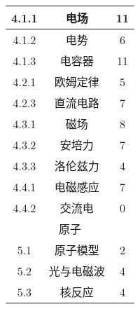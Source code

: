 \begin{center}
\begin{minipage}{0.48\textwidth}
\begin{tabular}{c|c|c}
            4.1.1&电场&11\\\hline
            4.1.2&电势&6\\\hline
            4.1.3&电容器&11\\\hline
            4.2.1&欧姆定律&5\\\hline
            4.2.3&直流电路&7\\\hline
            4.3.1&磁场&8\\\hline
            4.3.2&安培力&7\\\hline
            4.3.3&洛伦兹力&4\\\hline
            4.4.1&电磁感应&7\\\hline
            4.4.2&交流电&0\\\hline
            \multicolumn{3}{c}{原子}\\\hline
            5.1&原子模型&2\\\hline
            5.2&光与电磁波&4\\\hline
            5.3&核反应&4\\\hline
        \end{tabular}
    \end{minipage}
\end{center}
